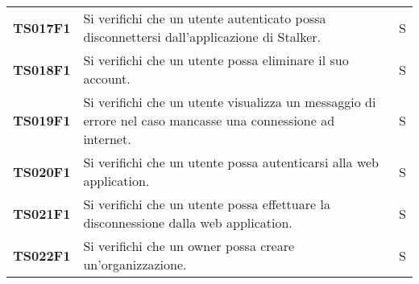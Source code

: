 \documentclass[../../piano-di-qualifica.tex]{subfiles}
\begin{document}
\begin{longtable}[H]{>{\centering\bfseries}m{3cm} >{}m{10cm} >{\centering\arraybackslash}m{3cm}}
  TS017F1            & Si verifichi che un utente autenticato possa disconnettersi dall'applicazione di Stalker.
                     & S                                                                                                                                                                                                                                                   \\

  TS018F1            & Si verifichi che un utente possa eliminare il suo account.
                     & S                                                                                                                                                                                                                                                  \\

  TS019F1            & Si verifichi che un utente visualizza un messaggio di errore nel caso mancasse una connessione ad internet.
                     & S                                                                                                                                                                                                                                                   \\

  TS020F1            & Si verifichi che un utente possa autenticarsi alla web application.
                     & S                                                                                                                                                                                                                                                   \\

  TS021F1            & Si verifichi che un utente possa effettuare la disconnessione dalla web application.
                     & S                                                                                                                                                                                                                                                   \\

  TS022F1            & Si verifichi che un owner possa creare un'organizzazione.
                     & S                                                                                                                                                                                                                                                   \\


\end{longtable}
\end{document}
